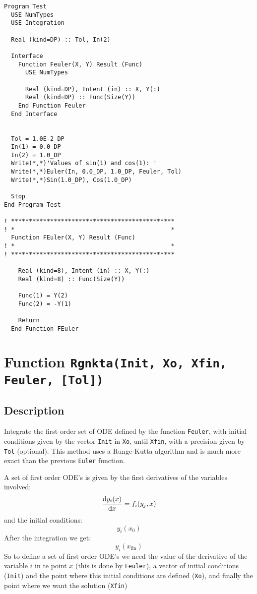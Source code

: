 \begin{verbatim}
Program Test
  USE NumTypes
  USE Integration

  Real (kind=DP) :: Tol, In(2)

  Interface
    Function Feuler(X, Y) Result (Func)
      USE NumTypes

      Real (kind=DP), Intent (in) :: X, Y(:)
      Real (kind=DP) :: Func(Size(Y))
    End Function Feuler
  End Interface


  Tol = 1.0E-2_DP
  In(1) = 0.0_DP
  In(2) = 1.0_DP
  Write(*,*)'Values of sin(1) and cos(1): '
  Write(*,*)Euler(In, 0.0_DP, 1.0_DP, Feuler, Tol)
  Write(*,*)Sin(1.0_DP), Cos(1.0_DP)

  Stop
End Program Test

! **********************************************  
! *                                            *
  Function FEuler(X, Y) Result (Func)
! *                                            *
! **********************************************

    Real (kind=8), Intent (in) :: X, Y(:)
    Real (kind=8) :: Func(Size(Y))

    Func(1) = Y(2)
    Func(2) = -Y(1)
    
    Return
  End Function FEuler
\end{verbatim}

\section{Function \texttt{Rgnkta(Init, Xo, Xfin, Feuler, [Tol])}}

\subsection{Description}

Integrate the first order set of ODE defined by the function
\texttt{Feuler}, with initial conditions given by the vector
\texttt{Init} in \texttt{Xo}, until \texttt{Xfin}, with a precision
given by \texttt{Tol} (optional). This method uses a Runge-Kutta
algorithm and is much more exact than the previous \texttt{Euler}
function. 

A set of first order ODE's is given by the first derivatives of the
variables involved:
\begin{displaymath}
  \frac{\mathrm{d} y_i(x)}{\mathrm{d} x} = f_i(y_j, x)
\end{displaymath}
and the initial conditions:
\begin{displaymath}
  y_i(x_0)
\end{displaymath}
After the integration we get:
\begin{displaymath}
  y_i(x_{\text{fin}})
\end{displaymath}
So to define a set of first order ODE's we need the value of the
derivative of the variable $i$ in te point $x$ (this is done by
\texttt{Feuler}), a vector of initial conditions (\texttt{Init}) and
the point where this initial conditions are defined (\texttt{Xo}), and
finally the point where we want the solution (\texttt{Xfin})

